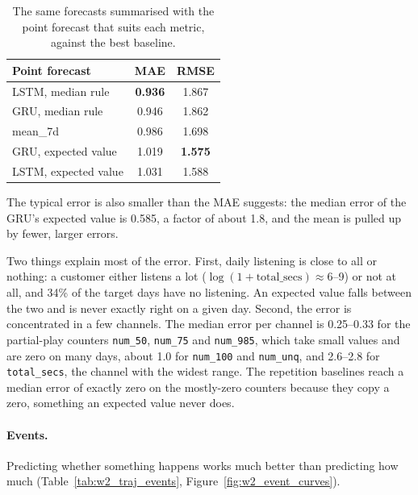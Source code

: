 \documentclass{article}
\begin{document}
\begin{table}[H]
\centering
\renewcommand{\arraystretch}{1.25}
\begin{tabular}{|l|c|c|}
\hline
\textbf{Point forecast} & \textbf{MAE} & \textbf{RMSE} \\ \hline
LSTM, median rule      & \textbf{0.936} & 1.867 \\ \hline
GRU, median rule       & 0.946 & 1.862 \\ \hline
mean\_7d               & 0.986 & 1.698 \\ \hline
GRU, expected value    & 1.019 & \textbf{1.575} \\ \hline
LSTM, expected value   & 1.031 & 1.588 \\ \hline
\end{tabular}
\caption{The same forecasts summarised with the point forecast that suits each metric, against the best baseline.}
\label{tab:w2_point_forecasts}
\end{table}

The typical error is also smaller than the MAE suggests: the median error of the GRU's expected value is 0.585, a factor of about 1.8, and the mean is pulled up by fewer, larger errors.

Two things explain most of the error. First, daily listening is close to all or nothing: a customer either listens a lot ($\log(1+\text{total\_secs}) \approx 6$--9) or not at all, and 34\% of the target days have no listening. An expected value falls between the two and is never exactly right on a given day. Second, the error is concentrated in a few channels. The median error per channel is 0.25--0.33 for the partial-play counters \texttt{num\_50}, \texttt{num\_75} and \texttt{num\_985}, which take small values and are zero on many days, about 1.0 for \texttt{num\_100} and \texttt{num\_unq}, and 2.6--2.8 for \texttt{total\_secs}, the channel with the widest range. The repetition baselines reach a median error of exactly zero on the mostly-zero counters because they copy a zero, something an expected value never does.

\paragraph{Events.} Predicting whether something happens works much better than predicting how much (Table~\ref{tab:w2_traj_events}, Figure~\ref{fig:w2_event_curves}).
\end{document}
